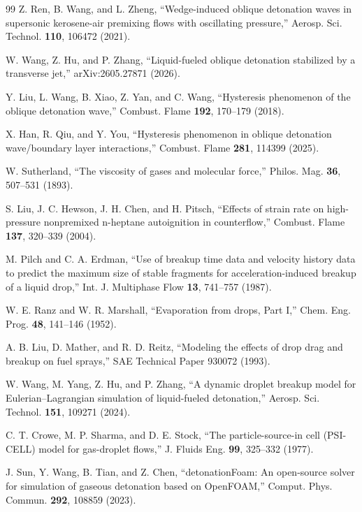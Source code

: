 \documentclass[aip,pof,preprint,amsmath,amssymb]{revtex4-2}
\begin{document}
\begin{thebibliography}{99}
 Z. Ren, B. Wang, and L. Zheng, ``Wedge-induced oblique detonation waves in supersonic kerosene-air premixing flows with oscillating pressure,'' Aerosp. Sci. Technol. \textbf{110}, 106472 (2021).

 W. Wang, Z. Hu, and P. Zhang, ``Liquid-fueled oblique detonation stabilized by a transverse jet,'' arXiv:2605.27871 (2026).

 Y. Liu, L. Wang, B. Xiao, Z. Yan, and C. Wang, ``Hysteresis phenomenon of the oblique detonation wave,'' Combust. Flame \textbf{192}, 170--179 (2018).

 X. Han, R. Qiu, and Y. You, ``Hysteresis phenomenon in oblique detonation wave/boundary layer interactions,'' Combust. Flame \textbf{281}, 114399 (2025).

 W. Sutherland, ``The viscosity of gases and molecular force,'' Philos. Mag. \textbf{36}, 507--531 (1893).

 S. Liu, J. C. Hewson, J. H. Chen, and H. Pitsch, ``Effects of strain rate on high-pressure nonpremixed n-heptane autoignition in counterflow,'' Combust. Flame \textbf{137}, 320--339 (2004).

 M. Pilch and C. A. Erdman, ``Use of breakup time data and velocity history data to predict the maximum size of stable fragments for acceleration-induced breakup of a liquid drop,'' Int. J. Multiphase Flow \textbf{13}, 741--757 (1987).

 W. E. Ranz and W. R. Marshall, ``Evaporation from drops, Part I,'' Chem. Eng. Prog. \textbf{48}, 141--146 (1952).

 A. B. Liu, D. Mather, and R. D. Reitz, ``Modeling the effects of drop drag and breakup on fuel sprays,'' SAE Technical Paper 930072 (1993).

 W. Wang, M. Yang, Z. Hu, and P. Zhang, ``A dynamic droplet breakup model for Eulerian--Lagrangian simulation of liquid-fueled detonation,'' Aerosp. Sci. Technol. \textbf{151}, 109271 (2024).

 C. T. Crowe, M. P. Sharma, and D. E. Stock, ``The particle-source-in cell (PSI-CELL) model for gas-droplet flows,'' J. Fluids Eng. \textbf{99}, 325--332 (1977).

 J. Sun, Y. Wang, B. Tian, and Z. Chen, ``detonationFoam: An open-source solver for simulation of gaseous detonation based on OpenFOAM,'' Comput. Phys. Commun. \textbf{292}, 108859 (2023).


\end{thebibliography}
\end{document}
